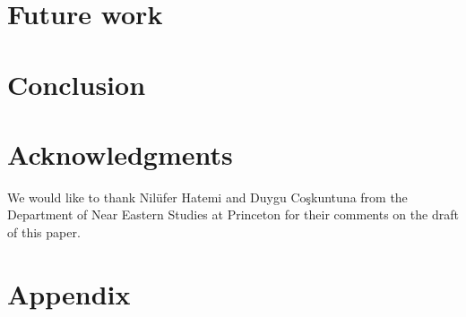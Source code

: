 \documentclass[10pt,twocolumn]{article}
\theoremstyle{nonumberplain}
\newcommand{\TODO}[1]{{\color{red}{[TODO: #1]}}}
\begin{document}
\TODO{gotta write}

\section{Future work}

\TODO{gotta write}

\section{Conclusion}

\TODO{gotta write}

\section*{Acknowledgments}

We would like to thank Nilüfer Hatemi and Duygu Coşkuntuna
from the Department of Near Eastern Studies at Princeton
for their comments on the draft of this paper.




\clearpage
\appendix
\section{Appendix}

\end{document}
